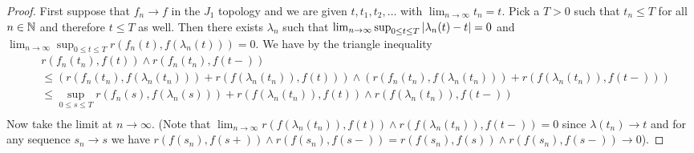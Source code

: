 \begin{proof}
First suppose that $f_n \to f$ in the $J_1$ topology and we are given $t, t_1, t_2, \dotsc$ with $\lim_{n \to \infty} t_n = t$.  Pick a $T>0$ such that $t_n \leq T$ for all $n \in \mathbb{N}$ and therefore $t \leq T$ as well.  Then there exists $\lambda_n$ such that $\lim_{n \to \infty} \sup_{0 \leq t \leq T} \left \vert \lambda_n(t) - t \right \vert = 0$ and $\lim_{n \to \infty} \sup_{0 \leq t \leq T} r(f_n(t), f(\lambda_n(t))) = 0$.  We have by the triangle inequality
\begin{align*}
&r(f_n(t_n), f(t)) \wedge r(f_n(t_n), f(t-)) \\
&\leq (r(f_n(t_n), f(\lambda_n(t_n)))+r(f(\lambda_n(t_n)), f(t))) \wedge (r(f_n(t_n), f(\lambda_n(t_n))) + r(f(\lambda_n(t_n)), f(t-))) \\
&\leq \sup_{0 \leq s \leq T} r(f_n(s), f(\lambda_n(s))) + r(f(\lambda_n(t_n)), f(t)) \wedge r(f(\lambda_n(t_n)), f(t-)) \\
\end{align*}
Now take the limit at $n \to \infty$.  (Note that $\lim_{n \to \infty} r(f(\lambda_n(t_n)), f(t)) \wedge r(f(\lambda_n(t_n)), f(t-)) = 0$ since $\lambda(t_n) \to t$ and for any sequence $s_n \to s$ we have $r(f(s_n), f(s+)) \wedge r(f(s_n), f(s-)) = r(f(s_n), f(s)) \wedge r(f(s_n), f(s-)) \to 0$).


\end{proof}
